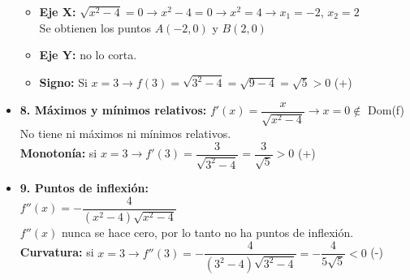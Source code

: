 \begin{itemize}
	\begin{itemize}
		\item \textbf{Eje X: }$\sqrt{x^2-4} = 0 \rightarrow x^2-4=0 \rightarrow x^2=4 \rightarrow x_1=-2$, $x_2=2$\\
		Se obtienen los puntos $A(-2, 0)$ y $B(2,0)$
		\item \textbf{Eje Y: }no lo corta.
		\item \textbf{Signo: }Si $x=3 \rightarrow f(3)=\sqrt{3^2-4}=\sqrt{9-4}=\sqrt{5}>0$ (+)
	\end{itemize}
	\item \textbf{8. Máximos y mínimos relativos: }
	$f'(x)=\dfrac{x}{\sqrt{x^2-4}} \rightarrow x=0 \notin$ Dom(f)\\
	No tiene ni máximos ni mínimos relativos.\\
	\textbf{Monotonía: }si $x=3 \rightarrow f'(3)=\dfrac{3}{\sqrt{3^2-4}}=\dfrac{3}{\sqrt{5}}>0$ (+)
	\item \textbf{9. Puntos de inflexión: }\\
	$f''(x)=-\dfrac{4}{(x^2-4)\sqrt{x^2-4}}$ \\
	$f''(x)$ nunca se hace cero, por lo tanto no ha puntos de inflexión.\\
	\textbf{Curvatura: }si $x=3 \rightarrow f''(3)=-\dfrac{4}{(3^2-4)\sqrt{3^2-4}}=-\dfrac{4}{5\sqrt{5}}<0$ (-)	
\end{itemize}

